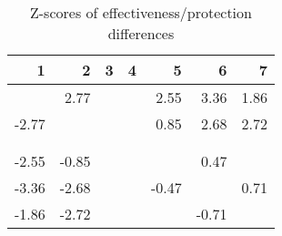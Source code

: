 \begin{table}[ht]
\centering
\begin{tabular}{rrrrrrr}
  \hline
1 & 2 & 3 & 4 & 5 & 6 & 7 \\ 
  \hline
 & 2.77 &  &  & 2.55 & 3.36 & 1.86 \\ 
  -2.77 &  &  &  & 0.85 & 2.68 & 2.72 \\ 
   &  &  &  &  &  &  \\ 
   &  &  &  &  &  &  \\ 
  -2.55 & -0.85 &  &  &  & 0.47 &  \\ 
  -3.36 & -2.68 &  &  & -0.47 &  & 0.71 \\ 
  -1.86 & -2.72 &  &  &  & -0.71 &  \\ 
   \hline
\end{tabular}
\caption{Z-scores of effectiveness/protection differences} 
\end{table}
